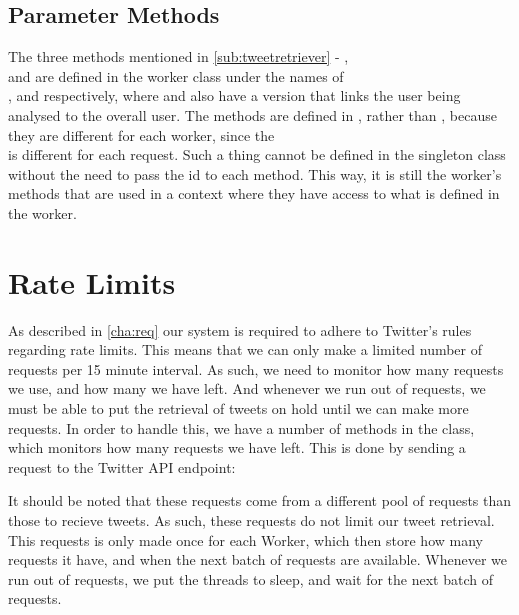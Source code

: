 \subsection{Parameter Methods}
The three methods mentioned in \autoref{sub:tweetretriever} -
,  \\and {} are defined in
the worker class under the names of \\,
 and  respectively, where
 and  also have a version
that links the user being analysed to the overall user. The methods are defined
in , rather than , because they are
different for each worker, since the \\ is different for
each request. Such a thing cannot be defined in the singleton class without the need
to pass the id to each method. This way, it is still the worker's methods that
are used in a context where they have access to what is defined in the worker.

\section{Rate Limits}\label{sec:rateLimit}
As described in \autoref{cha:req} our system is required to adhere to Twitter's
rules regarding rate limits. This means that we can only make a limited number of
requests per 15 minute interval. As such, we need to monitor how many requests
we use, and how many we have left. And whenever we run out of requests, we must
be able to put the retrieval of tweets on hold until we can make more requests.
In order to handle this, we have a number of methods in the 
class, which monitors how many requests we have left. This is done by sending a
request to the Twitter API endpoint: \nl

 \nl

It should be noted that these requests come from a different pool of requests
than those to recieve tweets. As such, these requests do not limit our tweet
retrieval. This requests is only made once for each Worker, which then store how
many requests it have, and when the next batch of requests are available.
Whenever we run out of requests, we put the threads to sleep, and wait for the
next batch of requests.











